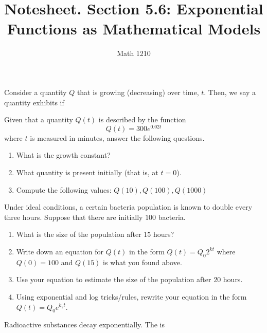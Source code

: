 \documentclass[12pt, a4paper]{article}
\author{Math 1210}
\title{Notesheet. Section 5.6: Exponential Functions as Mathematical Models}
\date{}
\begin{document}
\maketitle
\nameline
\begin{defi}
Consider a quantity \(Q\) that is growing (decreasing) over time,
\(t\). Then, we say a quantity exhibits  if
\end{defi}
\begin{ex}
  Given that a quantity \(Q(t)\) is described by the function \[
    Q(t) = 300 e^{0.02 t}
  \]
  where \(t\) is measured in minutes, answer the following questions.
  \begin{enumerate}
  \item What is the growth constant?
  \item What quantity is present initially (that is, at \(t=0\)).
  \item Compute the following values: \(Q(10), Q(100), Q(1000)\)
  \end{enumerate}
\end{ex}
\vspace{-0.8in}
\begin{ex}
  Under ideal conditions, a certain bacteria population is known to
  double every three hours. Suppose that there are initially \(100\)
  bacteria.
  \begin{enumerate}
  \item What is the size of the population after \(15\) hours?
    \vspace{0.75in}
  \item Write down an equation for \(Q(t)\) in the form \(Q(t) = Q_0
    2^{kt}\) where \(Q(0) = 100\) and \(Q(15)\) is what you found
    above.
    \vspace{0.75in}
  \item Use your equation to estimate the size of the population after
    \(20\) hours.
    \vspace{0.75in}
  \item Using exponential and log tricks/rules, rewrite your equation in the
    form \(Q(t) = Q_0 e^{k_2 t}\).
    \vspace{0.75in}
  \end{enumerate}
\end{ex}
\vspace{-2in}
\begin{defi}
  Radioactive substances decay exponentially. The  is
\end{defi}
\end{document}
